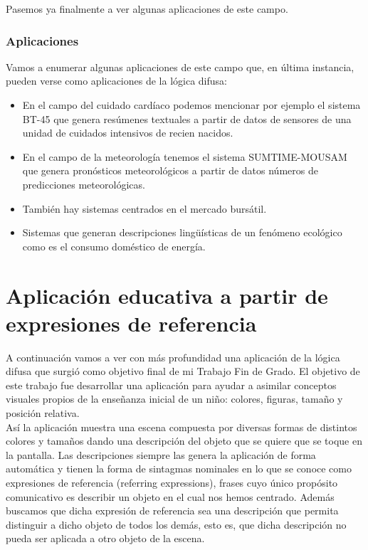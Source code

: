 \documentclass[10pt,a4paper]{article}
\begin{document}
Pasemos ya finalmente a ver algunas aplicaciones de este campo.
\subsubsection{Aplicaciones}

Vamos a enumerar algunas aplicaciones de este campo que, en última instancia, pueden verse como aplicaciones de la lógica difusa:

\begin{itemize}
\item En el campo del cuidado cardíaco podemos mencionar por ejemplo el sistema BT-45 que genera resúmenes textuales a partir de datos de sensores de una unidad de cuidados intensivos de recien nacidos.
\item En el campo de la meteorología tenemos el sistema SUMTIME-MOUSAM que genera pronósticos meteorológicos a partir de datos números de predicciones meteorológicas.
\item También hay sistemas centrados en el mercado bursátil.
\item Sistemas que generan descripciones lingüísticas de un fenómeno ecológico como es el consumo doméstico de energía.
\end{itemize}

\section{Aplicación educativa a partir de expresiones de referencia}

A continuación vamos a ver con más profundidad una aplicación de la lógica difusa que surgió como objetivo final de mi Trabajo Fin de Grado. El objetivo de este trabajo fue desarrollar una aplicación para ayudar a asimilar conceptos visuales propios de la enseñanza inicial de un niño: colores, figuras, tamaño y posición relativa.\\

Así la aplicación muestra una escena compuesta por diversas formas de distintos colores y tamaños dando una descripción del objeto que se quiere que se toque en la pantalla. Las descripciones siempre las genera la aplicación de forma automática y tienen la forma de sintagmas nominales en lo que se conoce como expresiones de referencia (referring expressions), frases cuyo único propósito comunicativo es describir un objeto en el cual nos hemos centrado. Además buscamos que dicha expresión de referencia sea una descripción que permita distinguir a dicho objeto de todos los demás, esto es, que dicha descripción no pueda ser aplicada a otro objeto de la escena.\\
\end{document}
